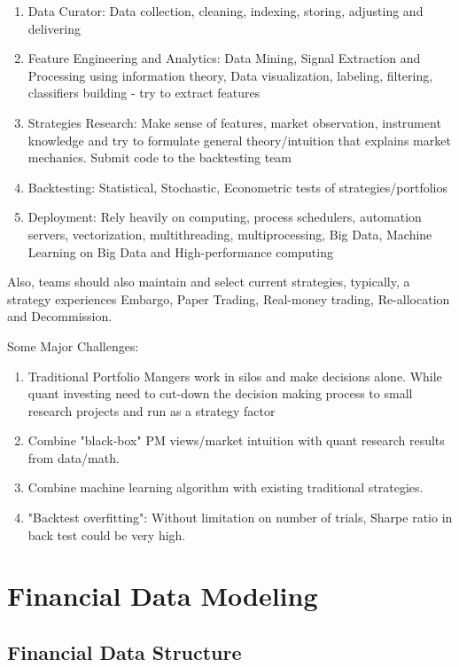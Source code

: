 \documentclass[11pt, openany]{book}              %
\begin{document}
\begin{enumerate}
 \item Data Curator: Data collection, cleaning, indexing, storing, adjusting and delivering 
 \item Feature Engineering and Analytics: Data Mining, Signal Extraction and Processing using information theory, Data visualization, labeling, filtering, classifiers building - try to extract features
 \item Strategies Research: Make sense of features, market observation, instrument knowledge and try to formulate general theory/intuition that explains market mechanics. Submit code to the backtesting team
 \item Backtesting: Statistical, Stochastic, Econometric tests of strategies/portfolios
 \item Deployment: Rely heavily on computing, process schedulers, automation servers, vectorization, multithreading, multiprocessing, Big Data, Machine Learning on Big Data and High-performance computing 
\end{enumerate}

Also, teams should also maintain and select current strategies, typically, a strategy experiences Embargo, Paper Trading, Real-money trading, Re-allocation and Decommission.

Some Major Challenges:

\begin{enumerate}
 \item Traditional Portfolio Mangers work in silos and make decisions alone. While quant investing need to cut-down the decision making process to small research projects and run as a strategy factor
 \item Combine "black-box" PM views/market intuition with quant research results from data/math. 
 \item Combine machine learning algorithm with existing traditional strategies. 	
 \item "Backtest overfitting": Without limitation on number of trials, Sharpe ratio in back test could be very high. 
\end{enumerate}


\chapter{Financial Data Modeling}

\section{Financial Data Structure}
\end{document}
